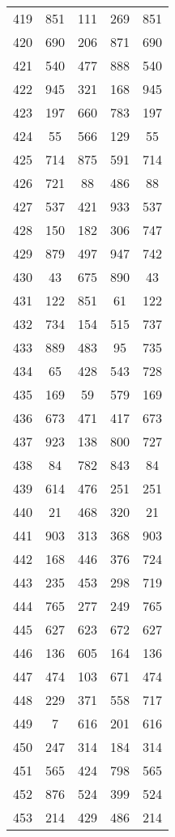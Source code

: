 \documentclass[a4paper,10pt,ngerman]{scrartcl}
\begin{document}
\begin{longtable}[c]{c|c|c|c|c}
    419 & 851 & 111 & 269 & 851 \\
    420 & 690 & 206 & 871 & 690 \\
    421 & 540 & 477 & 888 & 540 \\
    422 & 945 & 321 & 168 & 945 \\
    423 & 197 & 660 & 783 & 197 \\
    424 & 55 & 566 & 129 & 55 \\
    425 & 714 & 875 & 591 & 714 \\
    426 & 721 & 88 & 486 & 88 \\
    427 & 537 & 421 & 933 & 537 \\
    428 & 150 & 182 & 306 & 747 \\
    429 & 879 & 497 & 947 & 742 \\
    430 & 43 & 675 & 890 & 43 \\
    431 & 122 & 851 & 61 & 122 \\
    432 & 734 & 154 & 515 & 737 \\
    433 & 889 & 483 & 95 & 735 \\
    434 & 65 & 428 & 543 & 728 \\
    435 & 169 & 59 & 579 & 169 \\
    436 & 673 & 471 & 417 & 673 \\
    437 & 923 & 138 & 800 & 727 \\
    438 & 84 & 782 & 843 & 84 \\
    439 & 614 & 476 & 251 & 251 \\
    440 & 21 & 468 & 320 & 21 \\
    441 & 903 & 313 & 368 & 903 \\
    442 & 168 & 446 & 376 & 724 \\
    443 & 235 & 453 & 298 & 719 \\
    444 & 765 & 277 & 249 & 765 \\
    445 & 627 & 623 & 672 & 627 \\
    446 & 136 & 605 & 164 & 136 \\
    447 & 474 & 103 & 671 & 474 \\
    448 & 229 & 371 & 558 & 717 \\
    449 & 7 & 616 & 201 & 616 \\
    450 & 247 & 314 & 184 & 314 \\
    451 & 565 & 424 & 798 & 565 \\
    452 & 876 & 524 & 399 & 524 \\
    453 & 214 & 429 & 486 & 214 \\

\end{longtable}
\end{document}

